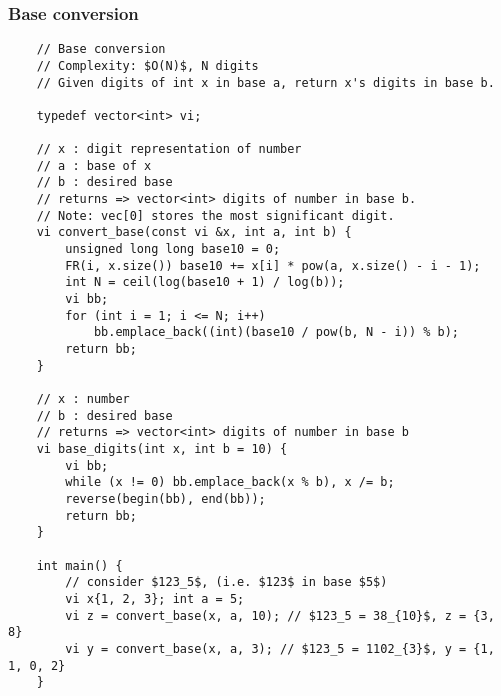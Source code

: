 \documentclass{article}
\begin{document}
\subsubsection{Base conversion}
\begin{verbatim}
    // Base conversion
    // Complexity: $O(N)$, N digits
    // Given digits of int x in base a, return x's digits in base b.
    
    typedef vector<int> vi;

    // x : digit representation of number
    // a : base of x
    // b : desired base
    // returns => vector<int> digits of number in base b.
    // Note: vec[0] stores the most significant digit.
    vi convert_base(const vi &x, int a, int b) {
        unsigned long long base10 = 0;
        FR(i, x.size()) base10 += x[i] * pow(a, x.size() - i - 1);
        int N = ceil(log(base10 + 1) / log(b));
        vi bb;
        for (int i = 1; i <= N; i++)
            bb.emplace_back((int)(base10 / pow(b, N - i)) % b);
        return bb;
    }

    // x : number
    // b : desired base
    // returns => vector<int> digits of number in base b
    vi base_digits(int x, int b = 10) {
        vi bb;
        while (x != 0) bb.emplace_back(x % b), x /= b;
        reverse(begin(bb), end(bb));
        return bb;
    }

    int main() {
        // consider $123_5$, (i.e. $123$ in base $5$)
        vi x{1, 2, 3}; int a = 5;
        vi z = convert_base(x, a, 10); // $123_5 = 38_{10}$, z = {3, 8}
        vi y = convert_base(x, a, 3); // $123_5 = 1102_{3}$, y = {1, 1, 0, 2}
    }
\end{verbatim}













\end{document}
